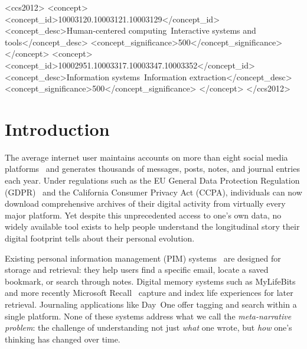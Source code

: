 \documentclass[manuscript,review]{acmart}
\begin{document}
\begin{CCSXML}
<ccs2012>
<concept>
<concept_id>10003120.10003121.10003129</concept_id>
<concept_desc>Human-centered computing~Interactive systems and tools</concept_desc>
<concept_significance>500</concept_significance>
</concept>
<concept>
<concept_id>10002951.10003317.10003347.10003352</concept_id>
<concept_desc>Information systems~Information extraction</concept_desc>
<concept_significance>500</concept_significance>
</concept>
</ccs2012>
\end{CCSXML}



\maketitle

\section{Introduction}
\label{sec:intro}

The average internet user maintains accounts on more than eight social media platforms~\cite{datareportal2024} and generates thousands of messages, posts, notes, and journal entries each year.
Under regulations such as the EU General Data Protection Regulation (GDPR)~\cite{gdpr2016} and the California Consumer Privacy Act (CCPA), individuals can now download comprehensive archives of their digital activity from virtually every major platform.
Yet despite this unprecedented access to one's own data, no widely available tool exists to help people understand the longitudinal story their digital footprint tells about their personal evolution.

Existing personal information management (PIM) systems~\cite{jones2007pim,lansdale1988psychology} are designed for storage and retrieval: they help users find a specific email, locate a saved bookmark, or search through notes.
Digital memory systems such as MyLifeBits~\cite{gemmell2002mylifebits} and more recently Microsoft Recall~\cite{microsoft2024recall} capture and index life experiences for later retrieval.
Journaling applications like Day~One offer tagging and search within a single platform.
None of these systems address what we call the \emph{meta-narrative problem}: the challenge of understanding not just \emph{what} one wrote, but \emph{how} one's thinking has changed over time.
\end{document}
